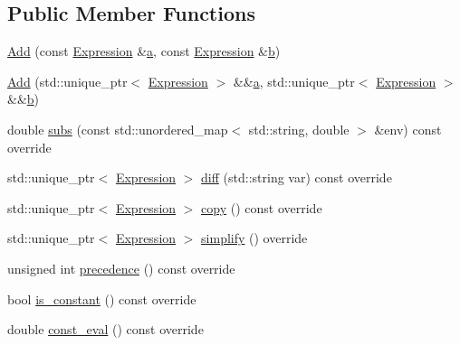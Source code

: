 \subsection*{Public Member Functions}
\begin{DoxyCompactItemize}
\item 
\mbox{\hyperlink{classsymcpp_1_1Add_a037075ce08cb010b8873724279ebc9f7}{Add}} (const \mbox{\hyperlink{classsymcpp_1_1Expression}{Expression}} \&\mbox{\hyperlink{classsymcpp_1_1Add_a9c4fbbc6d99a6625e08e141d4f2bc615}{a}}, const \mbox{\hyperlink{classsymcpp_1_1Expression}{Expression}} \&\mbox{\hyperlink{classsymcpp_1_1Add_af79047cdc26b03c717544e86df5590a6}{b}})
\item 
\mbox{\hyperlink{classsymcpp_1_1Add_aee8c8948ed62d1d59d65053da6370caf}{Add}} (std\+::unique\+\_\+ptr$<$ \mbox{\hyperlink{classsymcpp_1_1Expression}{Expression}} $>$ \&\&\mbox{\hyperlink{classsymcpp_1_1Add_a9c4fbbc6d99a6625e08e141d4f2bc615}{a}}, std\+::unique\+\_\+ptr$<$ \mbox{\hyperlink{classsymcpp_1_1Expression}{Expression}} $>$ \&\&\mbox{\hyperlink{classsymcpp_1_1Add_af79047cdc26b03c717544e86df5590a6}{b}})
\item 
double \mbox{\hyperlink{classsymcpp_1_1Add_a79d0aa670728ba4a257e777ed4ac1ec0}{subs}} (const std\+::unordered\+\_\+map$<$ std\+::string, double $>$ \&env) const override
\item 
std\+::unique\+\_\+ptr$<$ \mbox{\hyperlink{classsymcpp_1_1Expression}{Expression}} $>$ \mbox{\hyperlink{classsymcpp_1_1Add_ac885da5635431d264c643618729f6cec}{diff}} (std\+::string var) const override
\item 
std\+::unique\+\_\+ptr$<$ \mbox{\hyperlink{classsymcpp_1_1Expression}{Expression}} $>$ \mbox{\hyperlink{classsymcpp_1_1Add_a58633f0c101ef1e7cc3952846054d27f}{copy}} () const override
\item 
std\+::unique\+\_\+ptr$<$ \mbox{\hyperlink{classsymcpp_1_1Expression}{Expression}} $>$ \mbox{\hyperlink{classsymcpp_1_1Add_a5a68fdd76c2206399dd5a78c4b317505}{simplify}} () override
\item 
unsigned int \mbox{\hyperlink{classsymcpp_1_1Add_aec3ebe2c1bde461d8bd086e9c87aeeed}{precedence}} () const override
\item 
bool \mbox{\hyperlink{classsymcpp_1_1Add_a6a9286402a1b24bf3a7c1ed348357875}{is\+\_\+constant}} () const override
\item 
double \mbox{\hyperlink{classsymcpp_1_1Add_af3e5c83af088ffc00849e852e18b055c}{const\+\_\+eval}} () const override
\end{DoxyCompactItemize}
